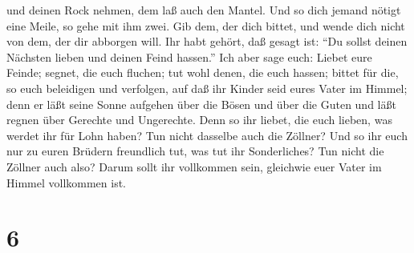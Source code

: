 und deinen Rock nehmen, dem laß auch den Mantel.  Und so
dich jemand nötigt eine Meile, so gehe mit ihm zwei.  Gib
dem, der dich bittet, und wende dich nicht von dem, der dir abborgen
will.  Ihr habt gehört, daß gesagt ist: ``Du sollst deinen
Nächsten lieben und deinen Feind hassen.''  Ich aber sage
euch: Liebet eure Feinde; segnet, die euch fluchen; tut wohl denen, die
euch hassen; bittet für die, so euch beleidigen und verfolgen,
 auf daß ihr Kinder seid eures Vater im Himmel; denn er
läßt seine Sonne aufgehen über die Bösen und über die Guten und läßt
regnen über Gerechte und Ungerechte.  Denn so ihr liebet,
die euch lieben, was werdet ihr für Lohn haben? Tun nicht dasselbe auch
die Zöllner?  Und so ihr euch nur zu euren Brüdern
freundlich tut, was tut ihr Sonderliches? Tun nicht die Zöllner auch
also?  Darum sollt ihr vollkommen sein, gleichwie euer
Vater im Himmel vollkommen ist.

\hypertarget{section-5}{%
\section{6}\label{section-5}}

